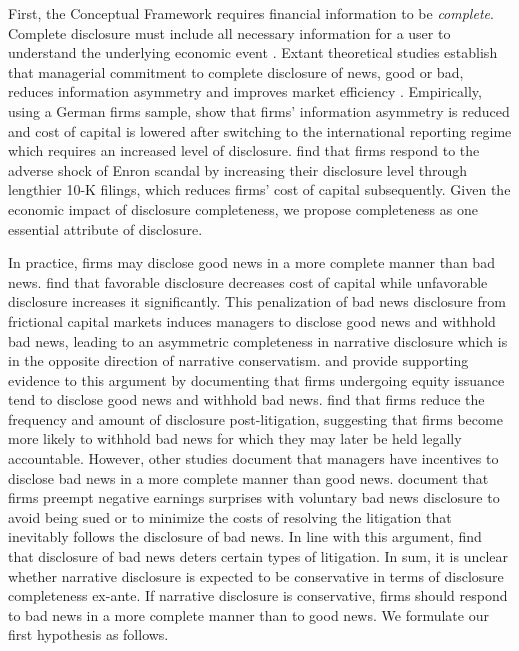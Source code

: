 \documentclass[letterpaper,12pt]{article}
\begin{document}
\begin{spacing}{1.5}
First, the Conceptual Framework requires financial information to be \textit{complete}. Complete disclosure must include all necessary information for a user to understand the underlying economic event \cite{fasbConceptualFrameworkFinancial2018}. Extant theoretical studies establish that managerial commitment to complete disclosure of news, good or bad, reduces information asymmetry and improves market efficiency \cite{glostenBidAskTransaction1985, diamondOptimalReleaseInformation1985, diamondDisclosureLiquidityCost1991, baimanRelationCapitalMarkets1996}. Empirically, using a German firms sample,  show that firms' information asymmetry is reduced and cost of capital is lowered after switching to the international reporting regime which requires an increased level of disclosure.  find that firms respond to the adverse shock of Enron scandal by increasing their disclosure level through lengthier 10-K filings, which reduces firms' cost of capital subsequently. Given the economic impact of disclosure completeness, we propose completeness as one essential attribute of disclosure.

In practice, firms may disclose good news in a more complete manner than bad news.  find that favorable disclosure decreases cost of capital while unfavorable disclosure increases it significantly. This penalization of bad news disclosure from frictional capital markets induces managers to disclose good news and withhold bad news, leading to an asymmetric completeness in narrative disclosure which is in the opposite direction of narrative conservatism.  and  provide supporting evidence to this argument by documenting that firms undergoing equity issuance tend to disclose good news and withhold bad news.  find that firms reduce the frequency and amount of disclosure post-litigation, suggesting that firms become more likely to withhold bad news for which they may later be held legally accountable. However, other studies document that managers have incentives to disclose bad news in a more complete manner than good news.  document that firms preempt negative earnings surprises with voluntary bad news disclosure to avoid being sued or to minimize the costs of resolving the litigation that inevitably follows the disclosure of bad news. In line with this argument,  find that disclosure of bad news deters certain types of litigation. In sum, it is unclear whether narrative disclosure is expected to be conservative in terms of disclosure completeness ex-ante. If narrative disclosure is conservative, firms should respond to bad news in a more complete manner than to good news. We formulate our first hypothesis as follows.


\end{spacing}
\end{document}
